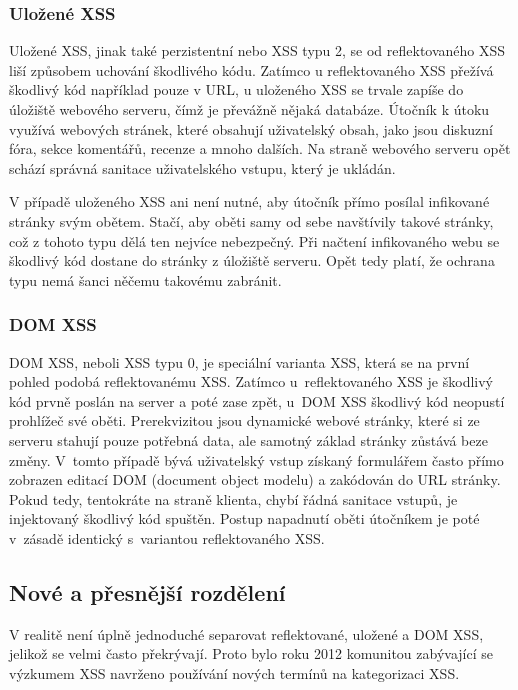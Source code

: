 \documentclass[11pt,conference]{IEEEtran}
\begin{document}
\subsubsection{Uložené XSS}
Uložené XSS, jinak také perzistentní nebo XSS typu 2, se od reflektovaného XSS liší způsobem uchování škodlivého kódu. Zatímco u reflektovaného XSS přežívá škodlivý kód například pouze v URL, u uloženého XSS se trvale zapíše do úložiště webového serveru, čímž je převážně nějaká databáze. Útočník k útoku využívá webových stránek, které obsahují uživatelský obsah, jako jsou diskuzní fóra, sekce komentářů, recenze a mnoho dalších. Na straně webového serveru opět schází správná sanitace uživatelského vstupu, který je ukládán. 

V případě uloženého XSS ani není nutné, aby útočník přímo posílal infikované stránky svým obětem. Stačí, aby oběti samy od sebe navštívily takové stránky, což z tohoto typu dělá ten nejvíce nebezpečný. Při načtení infikovaného webu se škodlivý kód dostane do stránky z úložiště serveru. Opět tedy platí, že ochrana typu  nemá šanci něčemu takovému zabránit.~\cite{XSS-owasp}

\subsubsection{DOM XSS}
DOM XSS, neboli XSS typu 0, je speciální varianta XSS, která se na první pohled podobá reflektovanému XSS. Zatímco u~reflektovaného XSS je škodlivý kód prvně poslán na server a poté zase zpět, u~DOM XSS škodlivý kód neopustí prohlížeč své oběti. Prerekvizitou jsou dynamické webové stránky, které si ze serveru stahují pouze potřebná data, ale samotný základ stránky zůstává beze změny. V~tomto případě bývá uživatelský vstup získaný formulářem často přímo zobrazen editací DOM (document object modelu) a zakódován do URL stránky. Pokud tedy, tentokráte na straně klienta, chybí řádná sanitace vstupů, je injektovaný škodlivý kód spuštěn. Postup napadnutí oběti útočníkem je poté v~zásadě identický s~variantou reflektovaného XSS.~\cite{DOM-XSS-owasp}

\subsection{Nové a přesnější rozdělení}
V realitě není úplně jednoduché separovat reflektované, uložené a DOM XSS, jelikož se velmi často překrývají. Proto bylo roku 2012 komunitou zabývající se výzkumem XSS navrženo používání nových termínů na kategorizaci XSS.
\end{document}
